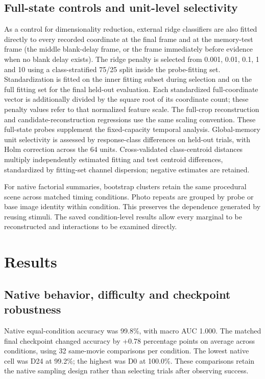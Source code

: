 \documentclass[11pt]{article}
\begin{document}
\subsection{Full-state controls and unit-level selectivity}
As a control for dimensionality reduction, external ridge classifiers are also fitted directly to every recorded coordinate at the final frame and at the memory-test frame (the middle blank-delay frame, or the frame immediately before evidence when no blank delay exists). The ridge penalty is selected from 0.001, 0.01, 0.1, 1 and 10 using a class-stratified 75/25 split inside the probe-fitting set. Standardization is fitted on the inner fitting subset during selection and on the full fitting set for the final held-out evaluation. Each standardized full-coordinate vector is additionally divided by the square root of its coordinate count; these penalty values refer to that normalized feature scale. The full-crop reconstruction and candidate-reconstruction regressions use the same scaling convention. These full-state probes supplement the fixed-capacity temporal analysis. Global-memory unit selectivity is assessed by response-class differences on held-out trials, with Holm correction across the 64 units. Cross-validated class-centroid distances multiply independently estimated fitting and test centroid differences, standardized by fitting-set channel dispersion; negative estimates are retained.

For native factorial summaries, bootstrap clusters retain the same procedural scene across matched timing conditions. Photo repeats are grouped by probe or base image identity within condition. This preserves the dependence generated by reusing stimuli. The saved condition-level results allow every marginal to be reconstructed and interactions to be examined directly.
\section{Results}
\subsection{Native behavior, difficulty and checkpoint robustness}
Native equal-condition accuracy was 99.8\%, with macro AUC 1.000. The matched final checkpoint changed accuracy by +0.78 percentage points on average across conditions, using 32 same-movie comparisons per condition. The lowest native cell was D24 at 99.2\%; the highest was D0 at 100.0\%. These comparisons retain the native sampling design rather than selecting trials after observing success.
\end{document}
